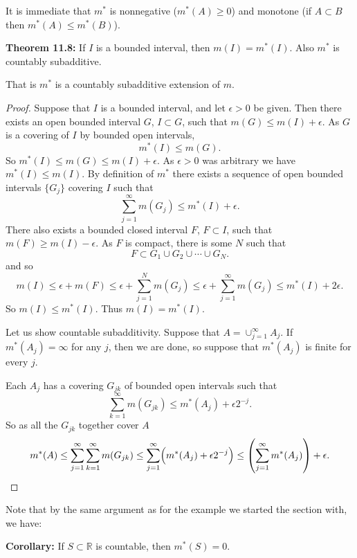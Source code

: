 \documentclass[12pt]{book}
\newcommand{\R}{{\mathbb{R}}}
\theoremstyle{plain}
\theoremstyle{remark}
\theoremstyle{definition}
\theoremstyle{exercise}
\theoremstyle{example}
\begin{document}
It is immediate that $m^*$ is nonnegative ($m^*(A) \geq 0$) and monotone (if $A \subset B$
then $m^*(A) \leq m^*(B)$).

\medskip

\textbf{Theorem 11.8:}
If $I$ is a bounded interval, then $m(I) = m^*(I)$.  Also $m^*$ is countably subadditive.

\medskip

That is $m^*$ is a countably subadditive extension of $m$.

\medskip

\begin{proof}
Suppose that $I$ is a bounded interval, and let $\epsilon > 0$ be given.
Then there exists an open bounded interval $G$, $I \subset G$, such that
$m(G) \leq m(I) + \epsilon$.
As $G$ is a covering of $I$ by bounded open intervals,
$$
m^*(I) \leq m(G) .
$$
So $m^*(I) \leq m(G) \leq m(I) + \epsilon$.  As $\epsilon > 0$
was arbitrary we have $m^*(I) \leq m(I)$.
By definition of $m^*$ there exists a sequence
of open bounded intervals $\{ G_j \}$ covering $I$ such that
$$
\sum_{j=1}^\infty m(G_j) \leq m^*(I) + \epsilon .
$$
There also exists a bounded closed interval $F$, $F \subset I$, such that
$m(F) \geq m(I)-\epsilon$.
As $F$ is compact, there is some $N$ such that
$$
F \subset G_1 \cup G_2 \cup \cdots \cup G_N .
$$
and so
$$
m(I) \leq \epsilon+m(F) \leq \epsilon + \sum_{j=1}^N m(G_j)
\leq 
\epsilon + \sum_{j=1}^\infty m(G_j) \leq m^*(I) + 2\epsilon .
$$
So $m(I) \leq m^*(I)$.  Thus $m(I) = m^*(I)$.

\medskip

Let us show countable subadditivity.
Suppose that $A = \cup_{j=1}^\infty A_j$.
If $m^*(A_j) = \infty$ for any $j$, then we are done, so suppose that
$m^*(A_j)$ is finite for every $j$.

Each $A_j$
has a covering $G_{jk}$ of bounded open intervals such that
$$
\sum_{k=1}^\infty m(G_{jk}) \leq m^*(A_j) + \epsilon 2^{-j} .
$$
So as all the $G_{jk}$ together cover $A$
$$
m^*(A)
\leq
\sum_{j=1}^\infty
\sum_{k=1}^\infty
m(G_{jk})
\leq
\sum_{j=1}^\infty
\Bigl( m^*(A_j) + \epsilon 2^{-j} \Bigr)
\leq
\left(
\sum_{j=1}^\infty
m^*(A_j) \right)
+ \epsilon .
$$
\end{proof}

Note that by the same argument as for the example we started the section
with, we have:

\medskip

\textbf{Corollary:}
If $S \subset \R$ is countable, then $m^*(S) = 0$.

\medskip
\end{document}
